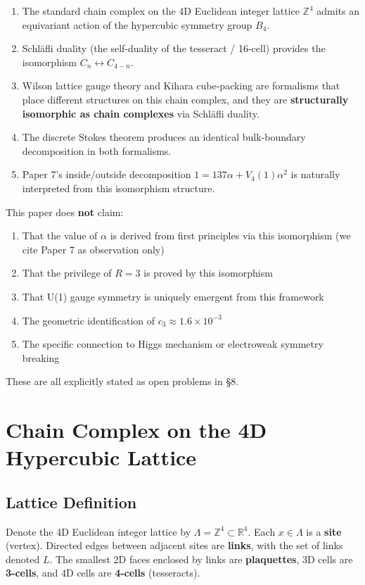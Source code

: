 \documentclass[a4paper,11pt]{article}
\begin{document}
\begin{enumerate}
\item The standard chain complex on the 4D Euclidean integer lattice $\mathbb{Z}^4$ admits an equivariant action of the hypercubic symmetry group $B_4$.
\item Schl\"afli duality (the self-duality of the tesseract / 16-cell) provides the isomorphism $C_n \leftrightarrow C_{4-n}$.
\item Wilson lattice gauge theory and Kihara cube-packing are formalisms that place different structures on this chain complex, and they are \textbf{structurally isomorphic as chain complexes} via Schl\"afli duality.
\item The discrete Stokes theorem produces an identical bulk-boundary decomposition in both formalisms.
\item Paper 7's inside/outside decomposition $1 = 137\alpha + V_4(1)\alpha^2$ is naturally interpreted from this isomorphism structure.
\end{enumerate}

This paper does \textbf{not} claim:

\begin{enumerate}
\item That the value of $\alpha$ is derived from first principles via this isomorphism (we cite Paper 7 as observation only)
\item That the privilege of $R = 3$ is proved by this isomorphism
\item That U(1) gauge symmetry is uniquely emergent from this framework
\item The geometric identification of $c_3 \approx 1.6 \times 10^{-3}$
\item The specific connection to Higgs mechanism or electroweak symmetry breaking
\end{enumerate}

These are all explicitly stated as open problems in §8.

\section{Chain Complex on the 4D Hypercubic Lattice}

\subsection{Lattice Definition}

Denote the 4D Euclidean integer lattice by $\Lambda = \mathbb{Z}^4 \subset \mathbb{R}^4$. Each $x \in \Lambda$ is a \textbf{site} (vertex). Directed edges between adjacent sites are \textbf{links}, with the set of links denoted $L$. The smallest 2D faces enclosed by links are \textbf{plaquettes}, 3D cells are \textbf{3-cells}, and 4D cells are \textbf{4-cells} (tesseracts).
\end{document}
